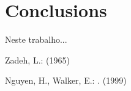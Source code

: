 \documentclass{llncs}
\begin{document}
\section{Conclusions}
Neste trabalho...

%

\begin{thebibliography}{1}
Zadeh, L.:
 (1965)

Nguyen, H., Walker, E.:
.
 (1999)
\end{thebibliography}
\end{document}
